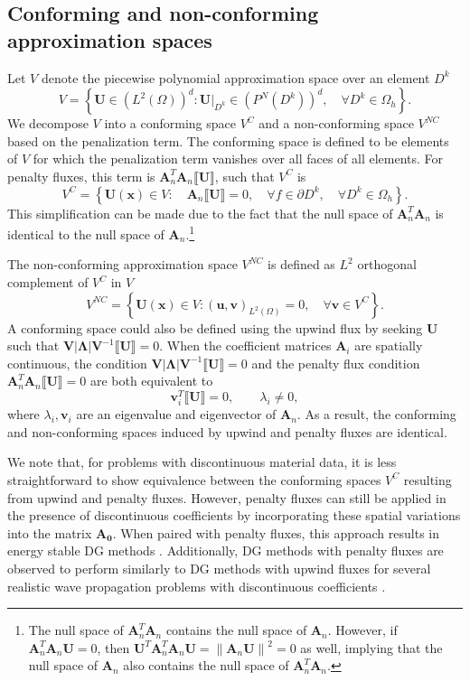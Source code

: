 \documentclass[preprint,10pt]{elsarticle}
\newcommand{\nor}[1]{\left\| #1 \right\|}
\newcommand{\LRp}[1]{\left( #1 \right)}
\newcommand{\LRb}[1]{\left| #1 \right|}
\newcommand{\LRc}[1]{\left\{ #1 \right\}}
\newcommand{\jump}[1] {\ensuremath{\llbracket#1\rrbracket}}
\newcommand{\Oh}{\Omega_h}
\newcommand{\note}[1]{#1}
\begin{document}
\subsection{Conforming and non-conforming approximation spaces}

Let $V$ denote the piecewise polynomial approximation space \note{over an element $D^k$}
\[
V = \LRc{ \bm{U} \in\LRp{ L^2(\Omega)}^d : \left.\bm{U}\right|_{D^k} \in \LRp{P^N(D^k)}^d, \quad \note{\forall D^k \in \Oh}}.  
\]
We decompose $V$ into a conforming space $V^C$ and a non-conforming space $V^{NC}$ based on the penalization term.  The conforming space is defined to be elements of $V$ for which the penalization term vanishes over all faces of all elements.  For penalty fluxes, \note{this term is $\bm{A}_n^T \bm{A}_n\jump{\bm{U}}$, such that} $V^C$ is
\begin{equation}
V^{C} = \LRc{ \bm{U}(\bm{x}) \in V: \quad  \bm{A}_n\jump{\bm{U}} = 0, \quad \forall f \in \partial D^k, \quad \forall D^k\in \Oh}.
\label{eq:conf}
\end{equation}
\note{This simplification can be made due to the fact that the null space of $\bm{A}_n^T\bm{A}_n$ is identical to the null space of $\bm{A}_n$.\footnote{\note{The null space of $\bm{A}_n^T\bm{A}_n$ contains the null space of $\bm{A}_n$.  However, if $\bm{A}_n^T\bm{A}_n\bm{U} = 0$, then $\bm{U}^T\bm{A}_n^T\bm{A}_n\bm{U} = \nor{\bm{A}_n\bm{U}}^2 = 0$ as well, implying that the null space of $\bm{A}_n$ also contains the null space of $\bm{A}_n^T\bm{A}_n$.
}}
}  
The non-conforming approximation space $V^{NC}$ is defined as $L^2$ orthogonal complement of $V^{C}$ in $V$
\[
V^{NC} = \LRc{ \bm{U}(\bm{x}) \in V: \LRp{\bm{u},\bm{v}}_{L^2(\Omega)} = 0, \quad \forall \bm{v}\in V^C}.
\]
A conforming space could also be defined using the upwind flux by seeking $\bm{U}$ such that $\bm{V}\LRb{\bm{\Lambda}}\note{\bm{V}^{-1}} \jump{\bm{U}} = 0$.  When the coefficient matrices $\bm{A}_i$ are spatially continuous, the condition $\bm{V}\LRb{\bm{\Lambda}}\note{\bm{V}^{-1}} \jump{\bm{U}} = 0$ and the penalty flux condition $\bm{A}_n^T \bm{A}_n\jump{\bm{U}} = 0$ are both equivalent to
\[
\bm{v}_i^T \jump{\bm{U}} = 0, \qquad \lambda_i \neq 0,
\]
where $\lambda_i, \bm{v}_i$ are an eigenvalue and eigenvector of $\bm{A}_n$.  As a result, the conforming and non-conforming spaces induced by upwind and penalty fluxes are identical.  

We note that, for problems with discontinuous material data, it is less straightforward to show equivalence between the conforming spaces $V^C$ resulting from upwind and penalty fluxes.  However, penalty fluxes can still be applied in the presence of discontinuous coefficients by incorporating these spatial variations into the matrix $\bm{A_0}$.  When paired with penalty fluxes, this approach results in energy stable DG methods \cite{chan2016weight1}.  Additionally, DG methods with penalty fluxes are observed to perform similarly to DG methods with upwind fluxes for several realistic wave propagation problems with discontinuous coefficients \cite{ye2016discontinuous}.  
\end{document}
